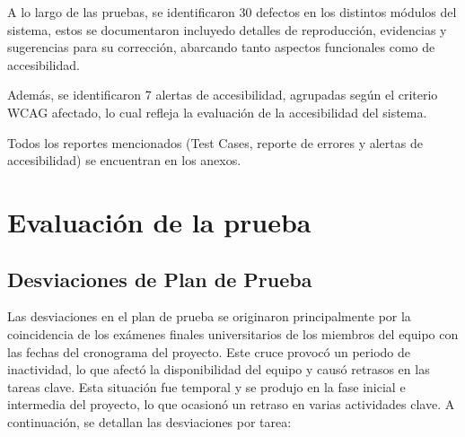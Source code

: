 \documentclass[stu, 12pt, letterpaper, donotrepeattitle, floatsintext, natbib]{apa7}
\begin{document}
A lo largo de las pruebas, se identificaron 30 defectos en los distintos módulos del sistema, estos se documentaron incluyedo detalles de reproducción, evidencias y sugerencias para su corrección, abarcando tanto aspectos funcionales como de accesibilidad. 

Además, se identificaron 7 alertas de accesibilidad, agrupadas según el criterio WCAG afectado, lo cual refleja la evaluación de la accesibilidad del sistema. 

\noindent Todos los reportes mencionados (Test Cases, reporte de errores y alertas de accesibilidad) se encuentran en los anexos.

\section{\large Evaluación de la prueba}

\subsection{Desviaciones de Plan de Prueba}

Las desviaciones en el plan de prueba se originaron principalmente por la coincidencia de los exámenes finales universitarios de los miembros del equipo con las fechas del cronograma del proyecto. Este cruce provocó un periodo de inactividad, lo que afectó la disponibilidad del equipo y causó retrasos en las tareas clave. 
Esta situación fue temporal y se produjo en la fase inicial e intermedia del proyecto, lo que ocasionó un retraso en varias actividades clave.
A continuación, se detallan las desviaciones por tarea:
\end{document}
